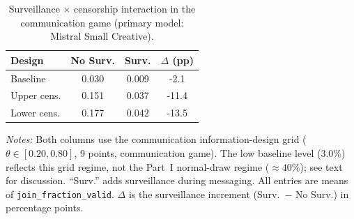 \begin{table}[t]
\centering
\caption{Surveillance $\times$ censorship interaction in the communication game (primary model: Mistral Small Creative).}
\label{tab:surv_censor}
\small
\begin{tabular}{lccc}
\toprule
Design & No Surv. & Surv. & $\Delta$ (pp) \\
\midrule
Baseline & 0.030 & 0.009 & -2.1 \\
Upper cens. & 0.151 & 0.037 & -11.4 \\
Lower cens. & 0.177 & 0.042 & -13.5 \\
\bottomrule
\end{tabular}
\par\vspace{0.25em}
\parbox{\columnwidth}{\footnotesize\emph{Notes:} Both columns use the communication information-design grid ($\theta \in [0.20, 0.80]$, 9 points, communication game). The low baseline level (3.0\%) reflects this grid regime, not the Part~I normal-draw regime (${\approx}40\%$); see text for discussion. ``Surv.'' adds surveillance during messaging. All entries are means of \texttt{join\_fraction\_valid}. $\Delta$ is the surveillance increment (Surv.\ $-$ No Surv.) in percentage points.}
\end{table}
